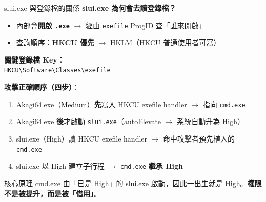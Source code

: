 \documentclass[12pt,aspectratio=169]{beamer}
\begin{document}
\begin{frame}[fragile]{slui.exe 與登錄檔的關係}
\textbf{slui.exe 為何會去讀登錄檔？}
\begin{itemize}
  \item 內部會\textbf{開啟 \texttt{.exe}} $\rightarrow$ 經由 \texttt{exefile} ProgID 查「誰來開啟」
  \item 查詢順序：\textcolor{red!70!black}{\textbf{HKCU 優先}} $\rightarrow$ HKLM（HKCU 普通使用者可寫）
\end{itemize}

\vspace{0.3em}
\textbf{關鍵登錄檔 Key：}\\
\texttt{\small HKCU\textbackslash Software\textbackslash Classes\textbackslash exefile}

\vspace{0.3em}
\textbf{攻擊正確順序（四步）}：
\begin{enumerate}
  \item Akagi64.exe（Medium）\textbf{先}寫入 HKCU exefile handler $\rightarrow$ 指向 \texttt{cmd.exe}
  \item Akagi64.exe \textbf{後}才啟動 \texttt{slui.exe}（autoElevate $\rightarrow$ 系統自動升為 High）
  \item slui.exe（High）讀 HKCU exefile handler $\rightarrow$ 命中攻擊者預先植入的 \texttt{cmd.exe}
  \item slui.exe 以 High 建立子行程 $\rightarrow$ \texttt{cmd.exe} \textbf{繼承 High}
\end{enumerate}

\begin{alertblock}{核心原理}
\small
cmd.exe 由「已是 High」的 slui.exe 啟動，因此一出生就是 High。\textbf{權限不是被提升，而是被「借用」}。
\end{alertblock}
\end{frame}
\end{document}
